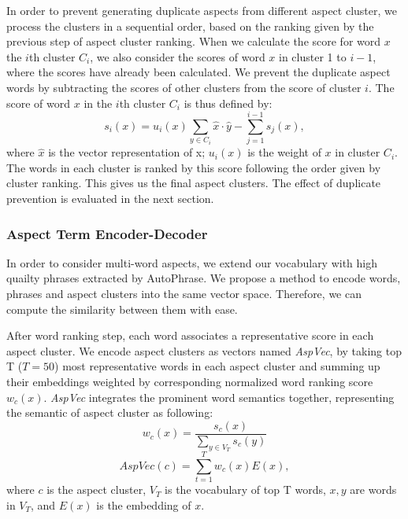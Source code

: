 In order to prevent generating duplicate aspects from different aspect cluster,
we process the clusters in a sequential order, based on the ranking given by the previous step of aspect cluster ranking. 
When we calculate the score for word $x$ the $i$th cluster $C_i$,
we also consider the scores of word $x$ in cluster 1 to $i-1$, 
where the scores have already been calculated. 
We prevent the duplicate aspect words by subtracting the scores 
of other clusters from the score of cluster $i$.
The score of word $x$ in the $i$th cluster $C_i$ is thus defined by:
\begin{equation}
s_i(x) = u_i(x) \sum_{y\in C_i}\hat{x}\cdot \hat{y} - \sum_{j=1}^{i-1}s_j(x),
\label{eq:wordscore}
\end{equation}
where $\hat{x}$ is the vector representation of x; $u_i(x)$ is the weight of $x$ in cluster $C_i$.
The words in each cluster is ranked by this score following the order given by cluster ranking.
This gives us the final aspect clusters. 
The effect of duplicate prevention is evaluated in the next section.

\subsubsection{Aspect Term Encoder-Decoder} %
In order to consider multi-word aspects, we extend our vocabulary with high quailty phrases extracted by AutoPhrase\cite{liu2017phrase}. 
We propose a method to encode words, phrases and aspect clusters into the same vector space.
Therefore, we can compute the similarity between them with ease.

After word ranking step, each word associates a representative score in each aspect cluster. 
We encode  aspect clusters as vectors named {\em AspVec}, by taking top T ($T=50$) most representative words in each aspect cluster and summing up their embeddings weighted by corresponding normalized word ranking score $w_c(x)$. 
{\em AspVec} integrates the prominent word semantics together, representing the semantic of aspect cluster as following:
\begin{equation}
w_c(x) = \frac{s_c(x)}{\sum_{y\in V_T}s_c(y)}
\end{equation}
\begin{equation}
AspVec(c) = \sum_{t=1}^T{w_c(x)E(x)},
\end{equation}
where $c$ is the aspect cluster, $V_T$ is the vocabulary of top T words, $x,y$ are words in $V_T$, and $E(x)$ is the embedding of $x$.

